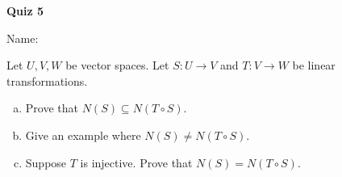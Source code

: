 \documentclass{article}
\begin{document}
\begin{center}
    {\bf Quiz 5}
\end{center}
Name:


Let $U, V, W$ be vector spaces. Let $S:U\to V$ and $T:V\to W$ be linear
transformations.
\begin{enumerate}[(a)]
    \item
        Prove that $N(S)\subseteq N(T\circ S)$.
        \vfill
        \vfill
    \item
        Give an example where $N(S)\neq N(T\circ S)$.
        \vfill
    \item
        Suppose $T$ is injective. Prove that $N(S)=N(T\circ S)$.
        \vfill
        \vfill
\end{enumerate}
    
\end{document}
